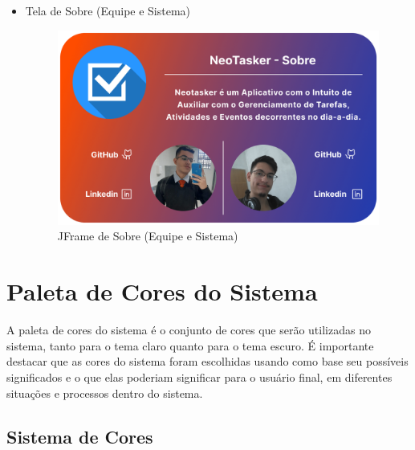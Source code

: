 \documentclass[a4paper,12pt]{article}
\begin{document}
\begin{itemize}
	\item Tela de Sobre (Equipe e Sistema)
	\begin{figure}[H]
		\centering
		\includegraphics[scale=0.20]{prototypes/white/About Us Panel Window.png}
		\caption{JFrame de Sobre (Equipe e Sistema)}
	\end{figure}
\end{itemize}

\section{Paleta de Cores do Sistema}
A paleta de cores do sistema é o conjunto de cores que serão utilizadas no sistema, tanto para o tema claro quanto para o tema escuro. É importante destacar que as cores do sistema foram escolhidas usando como base seu possíveis significados e o que elas poderiam significar para o usuário final, em diferentes situações e processos dentro do sistema.

\subsection{Sistema de Cores}

\end{document}
